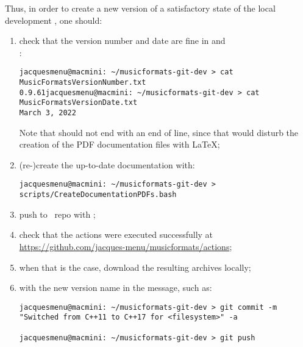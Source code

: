Thus, in order to create a new version of a satisfactory state of the local development \repo, one should:
\begin{enumerate}
\item check that the version number and date are fine in  and \\:
\begin{lstlisting}[language=TerminalSmall]
jacquesmenu@macmini: ~/musicformats-git-dev > cat MusicFormatsVersionNumber.txt
0.9.61jacquesmenu@macmini: ~/musicformats-git-dev > cat MusicFormatsVersionDate.txt
March 3, 2022
\end{lstlisting}
Note that  should not end with an end of line, since that would disturb the creation of the PDF documentation files with \LaTeX;

\item (re-)create the up-to-date documentation with:
\begin{lstlisting}[language=TerminalSmall]
jacquesmenu@macmini: ~/musicformats-git-dev > scripts/CreateDocumentationPDFs.bash
\end{lstlisting}

\item push to \mf\ repo with ;

\item check that the actions were executed successfully at \url{https://github.com/jacques-menu/musicformats/actions};

\item when that is the case, download the resulting  archives locally;

\item {} with the new version name in the  message, such as:
\begin{lstlisting}[language=Terminal]
jacquesmenu@macmini: ~/musicformats-git-dev > git commit -m "Switched from C++11 to C++17 for <filesystem>" -a

jacquesmenu@macmini: ~/musicformats-git-dev > git push
\end{lstlisting}


\end{enumerate}
